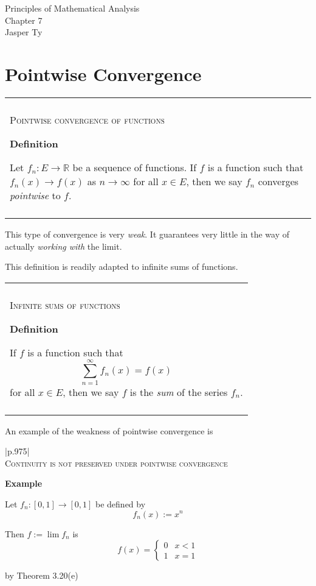 \documentclass{article}
\newenvironment{myboxed}{\bigskip\noindent\begin{tabular}{|p{.975\linewidth}|}\hline \\}{\\\\\hline\end{tabular}\bigskip}
\newenvironment{mytitle}{\noindent\large\begin{flushright}}{\end{flushright}\normalsize}
\begin{document}
\begin{mytitle}
    Principles of Mathematical Analysis \\
    Chapter 7 \\
    \normalsize Jasper Ty
\end{mytitle}

\section{Pointwise Convergence}

\begin{myboxed}
    \textsc{Pointwise convergence of functions}

    \textbf{Definition}

    Let $f_n: E \rightarrow \mathbb{R}$ be a sequence of functions. If $f$ is a function such that $f_n(x) \to f(x)$ as $n \to \infty$ for all $x \in E$, then we say $f_n$ converges \textit{pointwise} to $f$.
\end{myboxed}

This type of convergence is very \textit{weak}. It guarantees very little in the way of actually \textit{working with} the limit.

This definition is readily adapted to infinite sums of functions.

\begin{myboxed}
    \textsc{Infinite sums of functions}

    \textbf{Definition}

    If $f$ is a function such that 
    \[\sum_{n=1}^\infty f_n(x) = f(x)\] 
    for all $x \in E$, then we say $f$ is the \textit{sum} of the series $f_n$.
\end{myboxed}

An example of the weakness of pointwise convergence is

\begin{myboxed}
    \textsc{Continuity is not preserved under pointwise convergence}

    \textbf{Example} 

    Let $f_n: [0, 1] \rightarrow [0, 1]$ be defined by
    \[f_n(x) := x^n\]

    Then $f := \lim f_n$ is 
    \[f(x) = \begin{cases}
        0 & x < 1 \\
        1 & x = 1
    \end{cases}\]

    by Theorem 3.20(e)
\end{myboxed}
\end{document}
